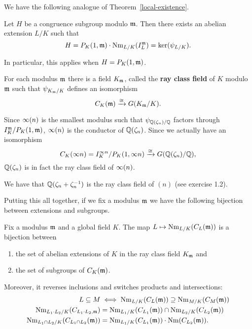We have the following analogue of Theorem~\ref{local-existence}.
\begin{thm}
Let $H$ be a congruence subgroup modulo $\mathfrak{m}$. Then there exists an abelian extension $L/K$ such that
\[
H=%
P_K(1,{\mm})\cdot \nm_{L/K}(I^{\mm}_L)=\ker(\psi_{L/K}).
\]
\end{thm}
In particular, this applies when $H=P_K(1,{\mathfrak{m}})$.
\begin{df}
For each modulus $\mathfrak{m}$ there is a field $K_{\mathfrak{m}}$, called the \textbf{ray class field} of $K$ modulo $\mathfrak{m}$ such that $\psi_{K_{\mathfrak{m}}/K}$ defines an isomorphism
\[
C_K(\mathfrak{m})\xrightarrow{\cong} G(K_{\mathfrak{m}}/K).
\]
\end{df}
\begin{ex}
Since $\infty(n)$ is the smallest modulus such that $\psi_{\mathbb{Q}(\zeta_n)/\mathbb{Q}}$ factors through $I_K^{\mathfrak{m}}/P_K(1,\mathfrak{m})$, 
$\infty(n)$ is the conductor of $\mathbb{Q}(\zeta_n)$. 
Since we actually have an isomorphism
\[
C_K(\infty n)=I_K^{\infty n}/P_K(1,\infty n)\xrightarrow{\cong} G(\mathbb{Q}(\zeta_n)/\mathbb{Q}),
\]
$\mathbb{Q}(\zeta_n)$ is in fact the ray class field of $\infty(n)$.

We have that $\mathbb{Q}(\zeta_n+\zeta_n^{-1})$ is the ray class field of $(n)$ (see exercise 1.2).
\end{ex}
Putting this all together, if we fix a modulus $\mathfrak{m}$ we have the following bijection between extensions and subgroups.
\begin{thm}
Fix a modulus $\mathfrak{m}$ and a global field $K$. The map $L\mapsto \operatorname{Nm}_{L/K}(C_{L}(\mathfrak{m}))$ is a bijection between
\begin{enumerate}
\item
the set of abelian extensions of $K$ in the ray class field $K_{\mathfrak{m}}$ and
\item
the set of subgroups of $C_K(\mathfrak{m})$.
\end{enumerate}
Moreover, it reverses inclusions and switches products and intersections:
\begin{align*}
L\subseteq M&\iff \operatorname{Nm}_{L/K}(C_{L}(\mathfrak{m}))\supseteq \operatorname{Nm}_{M/K}(C_{M}(\mathfrak{m}))\\
\operatorname{Nm}_{L_1\cdot L_2/K}(C_{L_1\cdot L_2,\mathfrak{m}})&=\operatorname{Nm}_{L_1/K}(C_{L_1}(\mathfrak{m}))\cap\operatorname{Nm}_{L_2/K}(C_{L_2}(\mathfrak{m}))\\
\operatorname{Nm}_{L_1\cap L_2/K}(C_{L_1\cap L_2}(\mathfrak{m}))&=\operatorname{Nm}_{L_1/K}(C_{L_1}(\mathfrak{m}))\cdot \operatorname{Nm}(C_{L_2}(\mathfrak{m})).
\end{align*}
\end{thm}

